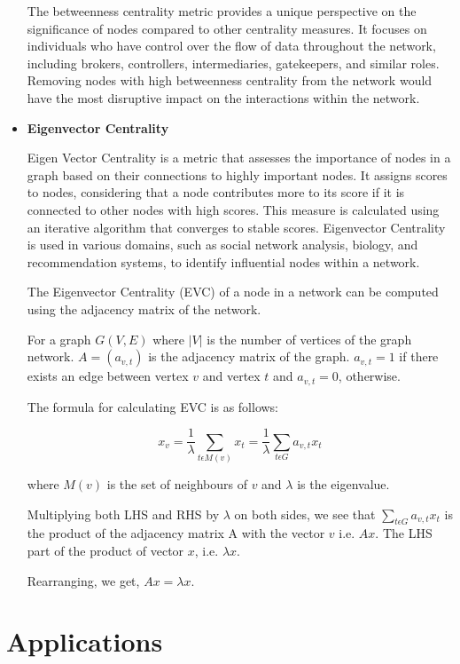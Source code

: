 \documentclass{article}
\begin{document}
\begin{itemize}
The betweenness centrality metric provides a unique perspective on the significance of nodes compared to other centrality measures. It focuses on individuals who have control over the flow of data throughout the network, including brokers, controllers, intermediaries, gatekeepers, and similar roles. Removing nodes with high betweenness centrality from the network would have the most disruptive impact on the interactions within the network.

\item \textbf{Eigenvector Centrality}

Eigen Vector Centrality is a metric that assesses the importance of nodes in a graph based on their connections to highly important nodes. It assigns scores to nodes, considering that a node contributes more to its score if it is connected to other nodes with high scores. This measure is calculated using an iterative algorithm that converges to stable scores. Eigenvector Centrality is used in various domains, such as social network analysis, biology, and recommendation systems, to identify influential nodes within a network.

The Eigenvector Centrality (EVC) of a node in a network can be computed using the adjacency matrix of the network. 

For a graph $G(V, E)$ where $|V|$ is the number of vertices of the graph network.  $A = (a_{v,t})$ is the adjacency matrix of the graph. $ a_{v,t} = 1 $ if there exists an edge between vertex $v$ and vertex $t$ and $ a_{v,t} = 0 $, otherwise. 

The formula for calculating EVC is as follows:

$$ x_{v} = \frac{1}{\lambda} \sum_{t \epsilon M(v)} x_{t} = \frac{1}{\lambda} \sum_{t \epsilon G } a_{v,t}x_{t} $$

where $M(v)$ is the set of neighbours of $v$ and $\lambda$ is the eigenvalue. 

Multiplying both LHS and RHS by $\lambda$ on both sides, we see that $\sum_{t \epsilon G} a_{v,t}x_{t}$ is the product of the adjacency matrix A with the vector $v$ i.e. $Ax$. The LHS part of the product of vector $x$, i.e. $\lambda x$.

Rearranging, we get, $Ax = \lambda x$.

\end{itemize}

\section*{Applications}
\end{document}
